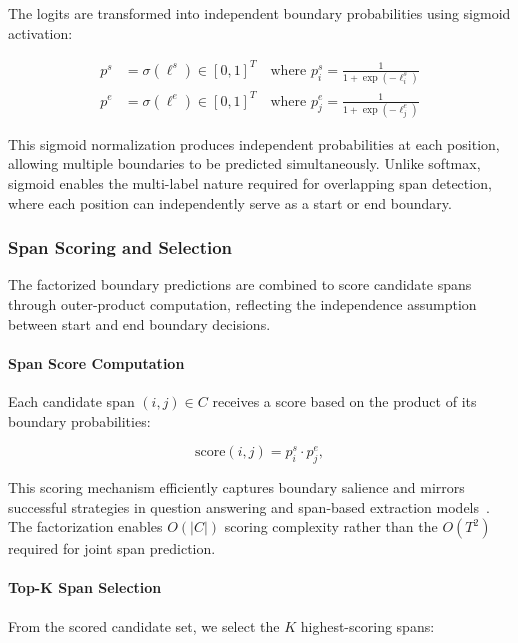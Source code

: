 The logits are transformed into independent boundary probabilities using sigmoid activation:

\begin{align}
p^s &= \sigma(\ell^s) \in [0,1]^T \quad \text{where } p^s_i = \frac{1}{1 + \exp(-\ell^s_i)} \label{eq:start-probs} \\
p^e &= \sigma(\ell^e) \in [0,1]^T \quad \text{where } p^e_j = \frac{1}{1 + \exp(-\ell^e_j)} \label{eq:end-probs}
\end{align}

This sigmoid normalization produces independent probabilities at each position, allowing multiple boundaries to be predicted simultaneously. Unlike softmax, sigmoid enables the multi-label nature required for overlapping span detection, where each position can independently serve as a start or end boundary.

\subsubsection{Span Scoring and Selection}
\label{sec:span-scoring}

The factorized boundary predictions are combined to score candidate spans through outer-product computation, reflecting the independence assumption between start and end boundary decisions.

\paragraph{Span Score Computation}

Each candidate span \((i,j) \in C\) receives a score based on the product of its boundary probabilities:

\begin{equation}
\mathrm{score}(i,j) = p^s_i \cdot p^e_j,
\label{eq:span-score}
\end{equation}

This scoring mechanism efficiently captures boundary salience and mirrors successful strategies in question answering and span-based extraction models~\cite{lee2016learning,xu2022faster}. The factorization enables \(O(|C|)\) scoring complexity rather than the \(O(T^2)\) required for joint span prediction.

\paragraph{Top-K Span Selection}

From the scored candidate set, we select the \(K\) highest-scoring spans:

